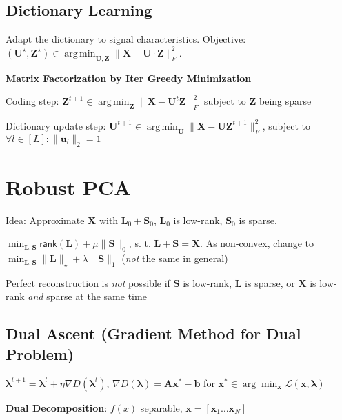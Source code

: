 \documentclass[a4paper, 11pt, landscape]{article}
\DeclareMathOperator*{\argmin}{arg\,min}
\begin{document}
\begin{multicols*}{3}
\subsection{Dictionary Learning}
Adapt the dictionary to signal characteristics. Objective: $(\mathbf{U}^\star, \mathbf{Z}^\star) \in \argmin_\mathbf{U,Z} \| \mathbf{X} - \mathbf{U} \cdot \mathbf{Z} \|_F^2$.

\textbf{Matrix Factorization by Iter Greedy Minimization}
\begin{inparaenum}
  \item Coding step: $\mathbf{Z}^{t+1} \in \argmin_\mathbf{Z} \| \mathbf{X} - \mathbf{U}^t \mathbf{Z} \|_F^2$ subject to $\mathbf{Z}$ being sparse
  \item Dictionary update step: $\mathbf{U}^{t+1} \in \argmin_\mathbf{U} \| \mathbf{X} - \mathbf{UZ}^{t+1} \|_F^2$, subject to $\forall l\in [L]:\|\mathbf{u}_l\|_2 = 1$
\end{inparaenum}

\section{Robust PCA}
\begin{compactitem}
	\item Idea: Approximate $\mathbf{X}$ with $\mathbf{L}_0 + \mathbf{S}_0$, $\mathbf{L}_0$ is low-rank, $\mathbf{S}_0$ is sparse.
	\item $\min_{\mathbf{L},\mathbf{S}}\mathsf{rank}(\mathbf{L}) + \mu \lVert \mathbf{S}\rVert_0$, s. t. $\mathbf{L} + \mathbf{S} = \mathbf{X}$. As non-convex, change to $\min_{\mathbf{L},\mathbf{S}} \|\mathbf{L}\|_\star + \lambda \lVert\mathbf{S}\rVert_1$ (\emph{not} the same in general)
	\item Perfect reconstruction is \emph{not} possible if $\mathbf{S}$ is low-rank, $\mathbf{L}$ is sparse, or $\mathbf{X}$ is low-rank \textit{and} sparse at the same time
\end{compactitem}

\subsection{Dual Ascent (Gradient Method for Dual Problem)}
$\bm{\lambda}^{t+1} = \bm{\lambda}^{t} + \eta \nabla D(\bm{\lambda}^t)$,
$ \nabla D (\bm{\lambda}) = \mathbf{A}\mathbf{x}^*-\mathbf{b}$ for $\mathbf{x}^* \in \arg\min_\mathbf{x} \mathcal{L}(\mathbf{x},\bm{\lambda})$

\textbf{Dual Decomposition}: $f(x)$ separable, $\mathbf{x} = \left[ \mathbf{x}_1 \dots \mathbf{x}_N \right]$


\end{multicols*}
\end{document}
